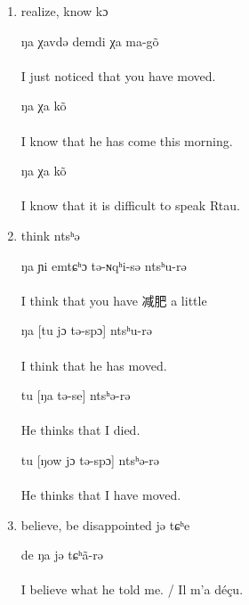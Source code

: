 \documentclass[oldfontcommands,oneside,a4paper,11pt]{article}
\newcommand{\ipa}[1]{{\phon #1}} %
\begin{document}
\begin{enumerate}
\item realize, know \ipa{kɔ}

\begin{exe}
\ex
\gll [ɲi jɔ tə-spej-sə] ŋa χavdə demdi χa ma-gõ \\
\\
\glt  I just noticed that you have moved.
\end{exe}

\begin{exe}
\ex
{} ŋa   χa kõ \\
\\
\glt  I know that he has come this morning.
\end{exe}

\begin{exe}
\ex
{} ŋa   χa kõ \\
\\
\glt  I know that it is difficult to speak Rtau.
\end{exe}

\item think \ipa{ntsʰə}

\begin{exe}
\ex
\gll ŋa ɲi emtɕʰɔ tə-ɴqʰi-sə ntsʰu-rə \\
\\
\glt   I think that you have 减肥 a little
\end{exe}

\begin{exe}
\ex
\gll ŋa [tu jɔ tə-spɔ] ntsʰu-rə \\
\\
\glt   I think that he has moved.
\end{exe}
 
\begin{exe}
\ex
\gll tu [ŋa  tə-se] ntsʰə-rə \\
\\
\glt  He thinks that I died.
\end{exe}


\begin{exe}
\ex
\gll tu [ŋow jɔ  tə-spɔ] ntsʰə-rə \\
\\
\glt   He thinks that I have moved.
\end{exe}

\item believe, be  disappointed \ipa{jə tɕʰe}
 
\begin{exe}
\ex
\gll [tu  ŋa-gi  jə-lə] de ŋa jə tɕʰã-rə \\
\\
\glt  I believe what he told me. / Il m'a déçu.
\end{exe}


\end{enumerate}
\end{document}
